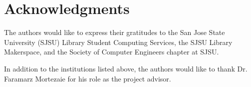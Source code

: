 \section*{Acknowledgments}

The authors would like to express their gratitudes to the San Jose State University (SJSU) Library Student Computing Services, the SJSU Library Makerspace, and the Society of Computer Engineers chapter at SJSU.

In addition to the institutions listed above, the authors would like to thank Dr. Faramarz Mortezaie for his role as the project advisor.